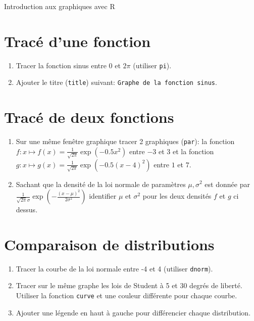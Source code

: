 \documentclass[a4paper,10pt,french]{article}
\newcommand{\fct}[1]{\texttt{#1}}
\newcommand{\code}[1]{\texttt{#1}}
\begin{document}
\thispagestyle{empty}

\hspace*{-0.5cm}

\begin{center}
\LARGE Introduction aux graphiques avec \textsf{R}
\end{center}
\bigskip

\section{Trac\'e d'une fonction}
\begin{enumerate}
\item Tracer la fonction sinus entre 0 et $2\pi$ (utiliser \code{pi}).
\item Ajouter le titre (\code{\fct{title}}) suivant: \code{Graphe de la fonction sinus}.
\end{enumerate}


\section{Trac\'e de deux fonctions}
\begin{enumerate}
\item Sur une m\^eme fen\^etre graphique tracer 2 graphiques
  (\texttt{par}): la fonction $f:x\mapsto
  f(x)=\frac{1}{\sqrt{2\pi}}\exp(-0.5x^2)$ entre $-3$ et $3$ et
    la fonction $g:x\mapsto
    g(x)=\frac{1}{\sqrt{2\pi}}\exp(-0.5(x-4)^2)$ entre $1$
      et $7$.
\item Sachant que la densit\'e de la loi normale de param\`etres $\mu,\sigma^2$ est donn\'ee par $\frac{1}{\sqrt{2\pi}\sigma}\exp(-\frac{(x-\mu)^2}{2\sigma^2})$ identifier $\mu$ et $\sigma^2$ pour les deux densit\'es $f$ et $g$ ci dessus. 
\end{enumerate}


\section{Comparaison de distributions}
\begin{enumerate}
\item Tracer la courbe de la loi normale entre -4 et 4 (utiliser \code{\fct{dnorm}}).
\item Tracer sur le m\^eme graphe les lois de Student \`a 5 et 30 degr\'es de libert\'e. Utiliser la fonction \code{\fct{curve}}
et une couleur diff\'erente pour chaque courbe.
\item Ajouter une l\'egende en haut \`a gauche pour diff\'erencier chaque distribution.
\end{enumerate}
\end{document}
